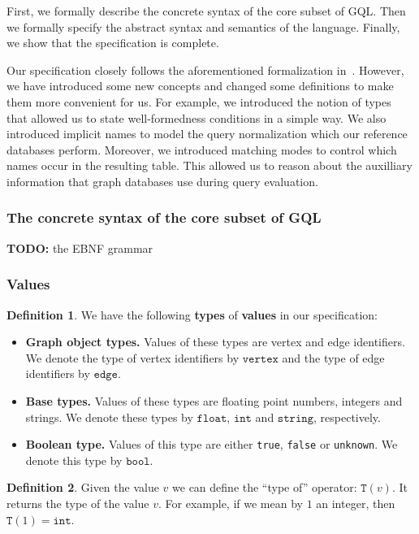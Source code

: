 \documentclass[14pt]{constructor-thesis}
\theoremstyle{definition}
\newtheorem{definition}{Definition}
\newcommand{\todo}[1]{
  \begin{tcolorbox}[colframe=red!75!black,colback=red!5!white,arc=0pt,fonttitle=\bfseries]
  \textbf{TODO:} #1
  \end{tcolorbox}
}
\begin{document}
First, we formally describe the concrete syntax of the core subset of GQL. Then we formally specify the abstract syntax and semantics of the language. Finally, we show that the specification is complete.

Our specification closely follows the aforementioned formalization in~\cite{GQL-formalized-on-paper}. However, we have introduced some new concepts and changed some definitions to make them more convenient for us. For example, we introduced the notion of types that allowed us to state well-formedness conditions in a simple way. We also introduced implicit names to model the query normalization which our reference databases perform. Moreover, we introduced matching modes to control which names occur in the resulting table. This allowed us to reason about the auxilliary information that graph databases use during query evaluation.

\subsubsection{The concrete syntax of the core subset of GQL}
\label{sec:GQL-syntax}

\todo{the EBNF grammar}

\subsubsection{Values}
\label{sec:GQL-values}

\begin{definition}
  We have the following \textbf{types} of \textbf{values} in our specification:
  \begin{itemize}
    \item \textbf{Graph object types.} Values of these types are vertex and edge identifiers. We denote the type of vertex identifiers by $\mathtt{vertex}$ and the type of edge identifiers by $\mathtt{edge}$.
    \item \textbf{Base types.} Values of these types are floating point numbers, integers and strings. We denote these types by $\mathtt{float}$, $\mathtt{int}$ and $\mathtt{string}$, respectively.
    \item \textbf{Boolean type.} Values of this type are either \texttt{true}, \texttt{false} or \texttt{unknown}. We denote this type by $\mathtt{bool}$.
  \end{itemize}
\end{definition}

\begin{definition}
  Given the value $v$ we can define the ``type of'' operator: $\mathtt{T}(v)$. It returns the type of the value $v$. For example, if we mean by $1$ an integer, then $\mathtt{T}(1) = \mathtt{int}$.
\end{definition}
\end{document}
